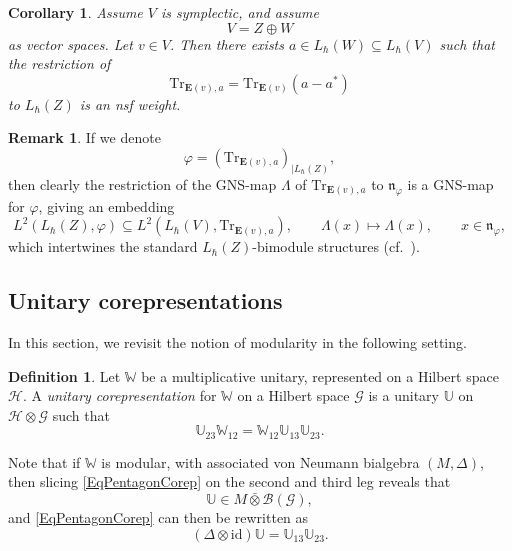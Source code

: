\documentclass[11pt, reqno]{amsart}
\newtheorem{cor}[theorem]{Corollary}
\theoremstyle{definition}
\newtheorem{defn}[theorem]{Definition}
\newtheorem{remark}[theorem]{Remark}
\numberwithin{equation}{section}
\def\Gc{\mathcal G}
\def\Hc{\mathcal H}
\newcommand{\Bc}{\mathcal{B}}
\newcommand{\id}{\mathrm{id}}
\newcommand{\Eb}{\mathbf{E}}
\newcommand{\Tr}{\mathrm{Tr}}
\newcommand{\Wbb}{\mathbb{W}}
\newcommand{\Ubb}{\mathbb{U}}
\newcommand{\mfn}{\mathfrak{n}}
\begin{document}
\begin{cor}\label{CorInvWeightQT}
Assume $V$ is symplectic, and assume
\[
V = Z\oplus W
\]
as vector spaces. Let $v\in V$. Then there exists $a \in L_{\hbar}(W) \subseteq L_{\hbar}(V)$ such that the restriction of 
\[
\Tr_{\Eb(v),a} = \Tr_{\Eb(v)}(a-a^*)
\]
to $L_{\hbar}(Z)$ is an nsf weight.
\end{cor} 

\begin{remark}\label{RemGNSRest}
If we denote 
\[
\varphi= (\Tr_{\Eb(v),a})_{\mid L_{\hbar}(Z)},
\]
then clearly the restriction of the GNS-map $\Lambda$ of $\Tr_{\Eb(v),a}$ to $\mfn_{\varphi}$ is a GNS-map for $\varphi$, giving an embedding 
\[
L^2(L_{\hbar}(Z),\varphi)\subseteq L^2(L_{\hbar}(V),\Tr_{\Eb(v),a}),\qquad \Lambda(x)\mapsto \Lambda(x),\qquad x\in \mfn_{\varphi},
\]
which intertwines the standard $L_{\hbar}(Z)$-bimodule structures (cf.\ \cite[Theorem IX.4.2]{Tak02}).
\end{remark}

\subsection{Unitary corepresentations}

In this section, we revisit the notion of modularity in the following setting. 

\begin{defn}
Let $\Wbb$ be a multiplicative unitary, represented on a Hilbert space $\Hc$. A \emph{unitary corepresentation} for $\Wbb$ on a Hilbert space $\Gc$ is a unitary $\Ubb$ on $\Hc \otimes \Gc$ such that 
\begin{equation}\label{EqPentagonCorep}
\Ubb_{23}\Wbb_{12} = \Wbb_{12}\Ubb_{13}\Ubb_{23}.
\end{equation}
\end{defn}

Note that if $\Wbb$ is modular, with associated  von Neumann bialgebra $(M,\Delta)$, then slicing \eqref{EqPentagonCorep} on the second and third leg reveals that 
\[
\Ubb \in M \bar{\otimes} \Bc(\Gc), 
\]
and \eqref{EqPentagonCorep} can then be rewritten as 
\[
(\Delta\otimes \id)\Ubb = \Ubb_{13}\Ubb_{23}.
\]
\end{document}
